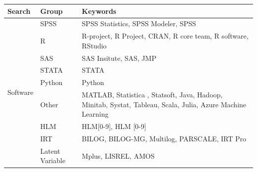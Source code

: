 \documentclass[english,,man]{apa6}
\theoremstyle{definition}
\theoremstyle{definition}
\theoremstyle{definition}
\theoremstyle{remark}
\begin{document}
\begin{landscape}

\begin{table}
\label{tab:searchwords}
\begin{tabularx}{\linewidth}{llX}

\toprule
Search & Group & Keywords \\
\midrule 

\multirow{9}{*}{Software} & SPSS            & SPSS Statistics, SPSS Modeler, SPSS \\
                          & R               & R-project, R Project, CRAN, R core team, R software, RStudio \\
                          & SAS             & SAS Insitute, SAS, JMP  \\
                          & STATA           & STATA          \\
                          & Python          & Python                  \\
                          & Other           & MATLAB, Statistica , Statsoft, Java, Hadoop, Minitab, Systat, Tableau, Scala, Julia, Azure Machine Learning \\
                          & HLM             & HLM[0-9], HLM [0-9]                            \\
                          & IRT             & BILOG, BILOG-MG, Multilog, PARSCALE, IRT Pro        \\
                          & Latent Variable & Mplus, LISREL, AMOS   \\
\midrule


\end{tabularx}
\end{table}
\end{landscape}
\end{document}
